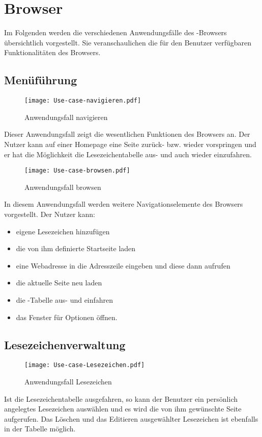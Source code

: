 
\chapter{Browser}
Im Folgenden werden die verschiedenen Anwendungsfälle des \SECH-Browsers übersichtlich vorgestellt. Sie veranschaulichen die für den Benutzer verfügbaren Funktionalitäten des Browsers.

\section{Menüführung}
\begin{figure}[htb]
\centering
\texttt{[image: Use-case-navigieren.pdf]}
	\caption{Anwendungsfall \glqq navigieren\grqq\xspace}
\end{figure}
Dieser Anwendungsfall zeigt die wesentlichen Funktionen des Browsers an. Der Nutzer kann auf einer Homepage eine Seite zurück- bzw. wieder vorspringen und er hat die Möglichkeit die Lesezeichentabelle aus- und auch wieder einzufahren.

\begin{figure}[htb]
\centering
\texttt{[image: Use-case-browsen.pdf]}
	\caption{Anwendungsfall \glqq browsen\grqq\xspace}
\end{figure}
In diesem Anwendungsfall werden weitere Navigationselemente des Browsers vorgestellt. Der Nutzer kann:
\begin{itemize}
	\item eigene Lesezeichen hinzufügen
	\item die von ihm definierte Startseite laden
	\item eine Webadresse in die Adresszeile eingeben und diese dann aufrufen
	\item die aktuelle Seite neu laden
	\item die \SEARCH-Tabelle aus- und einfahren
	\item das Fenster für Optionen öffnen.
\end{itemize}

\section{Lesezeichenverwaltung}
\begin{figure}[htb]
\centering
\texttt{[image: Use-case-Lesezeichen.pdf]} %
	\caption{Anwendungsfall \glqq Lesezeichen\grqq\xspace}
\end{figure}
Ist die Lesezeichentabelle ausgefahren, so kann der Benutzer ein persönlich angelegtes Lesezeichen auswählen und es wird die von ihm gewünschte Seite aufgerufen. Das Löschen und das Editieren ausgewählter Lesezeichen ist ebenfalls in der Tabelle möglich.

